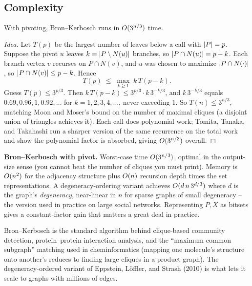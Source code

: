 \subsection{Complexity}

\begin{theorem}
\label{ch29:thm-bk-time}
With pivoting, Bron--Kerbosch runs in $O(3^{n/3})$ time.
\end{theorem}

\begin{proof}[Idea]
Let $T(p)$ be the largest number of leaves below a call with $\lvert P\rvert=p$. Suppose
the pivot $u$ leaves $k=\lvert P\setminus N(u)\rvert$ branches, so $\lvert P\cap N(u)\rvert=p-k$.
Each branch vertex $v$ recurses on $P\cap N(v)$, and $u$ was chosen to maximize
$\lvert P\cap N(\cdot)\rvert$, so $\lvert P\cap N(v)\rvert\le p-k$. Hence
\[
  T(p)\;\le\;\max_{k\ge1}\; k\,T(p-k).
\]
Guess $T(p)\le 3^{p/3}$. Then $k\,T(p-k)\le 3^{p/3}\cdot k\,3^{-k/3}$, and
$k\,3^{-k/3}$ equals $0.69, 0.96, 1, 0.92,\dots$ for $k=1,2,3,4,\dots$, never
exceeding $1$. So $T(n)\le 3^{n/3}$, matching Moon and Moser's bound on the number
of maximal cliques (a disjoint union of triangles achieves it). Each call does
polynomial work; Tomita, Tanaka, and Takahashi run a sharper version of the same
recurrence on the total work and show the polynomial factor is absorbed, giving
$O(3^{n/3})$ overall.
\end{proof}

\begin{complexitybox}
\textbf{Bron--Kerbosch with pivot.} Worst-case time $O(3^{n/3})$, optimal in
the output-size sense (you cannot beat the number of cliques you must print).
Memory is $O(n^2)$ for the adjacency structure plus $O(n)$ recursion depth
times the set representations. A degeneracy-ordering variant achieves
$O(d\,n\,3^{d/3})$ where $d$ is the graph's \emph{degeneracy}, near-linear in
$n$ for sparse graphs of small degeneracy -- the version used in practice on
large social networks. Representing $P,X$ as bitsets gives a constant-factor gain that
matters a great deal in practice.
\end{complexitybox}

\begin{applicationbox}
Bron--Kerbosch is the standard algorithm behind clique-based community detection,
protein--protein interaction analysis, and the ``maximum common subgraph''
matching used in cheminformatics (mapping one molecule's structure onto
another's reduces to finding large cliques in a product graph). The
degeneracy-ordered variant of Eppstein, L\"offler, and Strash (2010) is what lets
it scale to graphs with millions of edges.
\end{applicationbox}

